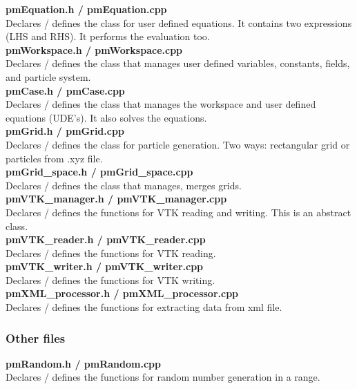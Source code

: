 \documentclass[a4paper,12pt,openany]{book}
\theoremstyle{break}
\begin{document}
\textbf{pmEquation.h / pmEquation.cpp} \\
Declares / defines the class for user defined equations. It contains two expressions (LHS and RHS). It performs the evaluation too. \\

\textbf{pmWorkspace.h / pmWorkspace.cpp} \\
Declares / defines the class that manages user defined variables, constants, fields, and particle system. \\

\textbf{pmCase.h / pmCase.cpp} \\
Declares / defines the class that manages the workspace and user defined equations (UDE's). It also solves the equations. \\

\textbf{pmGrid.h / pmGrid.cpp} \\
Declares / defines the class for particle generation. Two ways: rectangular grid or particles from .xyz file. \\

\textbf{pmGrid\_space.h / pmGrid\_space.cpp} \\
Declares / defines the class that manages, merges grids. \\

\textbf{pmVTK\_manager.h / pmVTK\_manager.cpp} \\
Declares / defines the functions for VTK reading and writing. This is an abstract class. \\

\textbf{pmVTK\_reader.h / pmVTK\_reader.cpp} \\
Declares / defines the functions for VTK reading. \\

\textbf{pmVTK\_writer.h / pmVTK\_writer.cpp} \\
Declares / defines the functions for VTK writing. \\

\textbf{pmXML\_processor.h / pmXML\_processor.cpp} \\
Declares / defines the functions for extracting data from xml file. \\

\subsubsection{Other files}
\textbf{pmRandom.h / pmRandom.cpp} \\
Declares / defines the functions for random number generation in a range. \\
\end{document}
